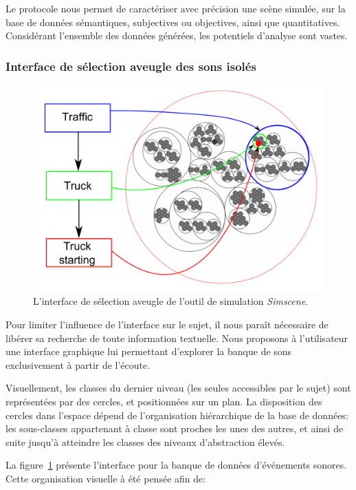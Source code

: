 Le protocole nous permet de caractériser avec précision une scène simulée, sur la base de données sémantiques, subjectives ou objectives, ainsi que quantitatives. Considérant l'ensemble des données générées, les potentiels d'analyse sont vastes.

\subsubsection{Interface de sélection aveugle des sons isolés}
\label{sec:ch4_ssf}

\begin{figure}[t]
        \myfloatalign
        \includegraphics[width=.8\linewidth]{gfx/ch_4/SSF}
       \caption{L'interface de sélection aveugle de l'outil de simulation \emph{Simscene}.}\label{fig:ssf}
\end{figure}

Pour limiter l’influence de l’interface sur le sujet, il nous paraît nécessaire de libérer sa recherche de toute information textuelle. Nous proposons à l'utilisateur une interface graphique lui permettant d’explorer la banque de sons exclusivement à partir de l’écoute.

Visuellement, les classes du dernier niveau (les seules accessibles par le sujet) sont représentées par des cercles, et positionnées sur un plan. La disposition des cercles dans l'espace dépend de l’organisation hiérarchique de la base de données: les sous-classes appartenant à   classe sont proches les unes des autres, et ainsi de suite jusqu'à atteindre les classes des niveaux d'abstraction élevés.

La figure~\ref{fig:ssf} présente l'interface pour la banque de données d'événements sonores. Cette organisation visuelle à été pensée afin de:

